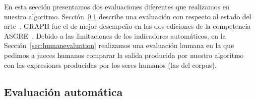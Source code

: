 %  
En esta secci\'on presentamos dos evaluaciones diferentes que realizamos en nuestro algoritmo. Secci\'on~\ref{sec:automaticevaluation} describe una evaluaci\'on con respecto al estado del arte~\cite{KrahmerGRAPH}. GRAPH fue el de mejor desempe\~no en las dos ediciones de la competencia ASGRE~\cite{gatt-balz-kow:2008:ENLG}. Debido a las limitaciones de los indicadores autom\'aticos, en la Secci\'on~\ref{sec:humanevaluation} realizamos una evaluaci\'on humana en la que pedimos a jueces humanos comparar la salida producida por nuestro algoritmo con las expresiones producidas por los seres humanos (las del corpus).


\subsection{Evaluaci\'on autom\'atica } \label{sec:automaticevaluation}



